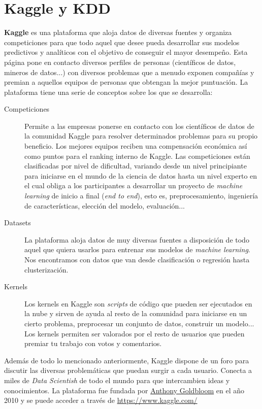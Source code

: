 \chapter{Kaggle y KDD}
\textbf{Kaggle} es una plataforma que aloja datos de diversas fuentes y organiza 
competiciones para que todo aquel que desee pueda desarrollar sus modelos predictivos y analíticos 
con el objetivo de conseguir el mayor desempeño.
Esta página pone en contacto diversos perfiles de personas (científicos de datos, mineros de datos...) 
con diversos problemas que a menudo exponen compañías y premian a aquellos equipos de personas que 
obtengan la mejor puntuación.
La plataforma tiene una serie de conceptos sobre los que se desarrolla:
\begin{description}
  \item[Competiciones] Permite a las empresas ponerse en contacto con los científicos de datos de la 
  comunidad Kaggle para resolver determinados problemas para su propio beneficio. Los mejores equipos 
  reciben una compensación económica así como puntos para el ranking interno de Kaggle.
  Las competiciones están clasificadas por nivel de dificultad, variando desde un nivel principiante 
  para iniciarse en el mundo de la ciencia de datos hasta un nivel experto en el cual obliga a los 
  participantes a desarrollar un proyecto de \textit{machine learning} de inicio a final (\textit{end to end}), esto es, 
  preprocesamiento, ingeniería de características, elección del modelo, evaluación...
  \item[Datasets] La plataforma aloja datos de muy diversas fuentes a disposición de todo aquel que quiera usarlos
  para entrenar sus modelos de \textit{machine learning}. Nos encontramos con datos que van desde clasificación o
  regresión hasta clusterización.
  \item[Kernels] Los kernels en Kaggle son \textit{scripts} de código que pueden ser ejecutados 
  en la nube y sirven de ayuda al resto de la comunidad para iniciarse en un cierto problema, preprocesar un 
  conjunto de datos, construir un modelo...
  Los kernels permiten ser valorados por el resto de usuarios que pueden premiar tu trabajo con votos y comentarios.
\end{description}
Además de todo lo mencionado anteriormente, Kaggle dispone de un foro para discutir las diversas 
problemáticas que puedan surgir a cada usuario. Conecta a miles de \textit{Data Scientish} de todo el mundo 
para que intercambien ideas y conocimientos.
La plataforma fue fundada por \href{https://en.wikipedia.org/wiki/Anthony_Goldbloom}{Anthony Goldbloom} 
en el año 2010 y se puede acceder a través de \url{https://www.kaggle.com/}
\newline

